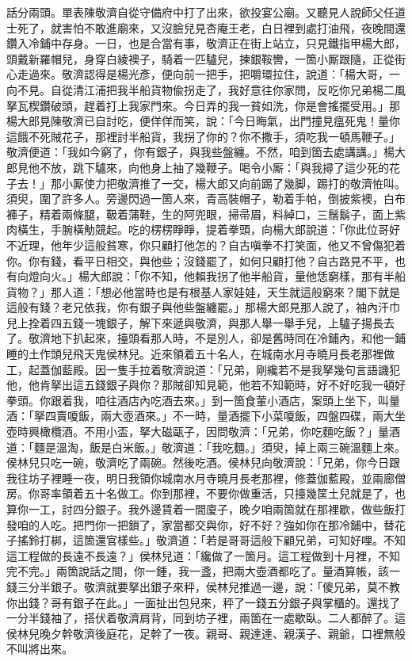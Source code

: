 話分兩頭。單表陳敬濟自從守備府中打了出來，欲投宴公廟。又聽見人說師父任道士死了，就害怕不敢進廟來，又沒臉兒見杏庵王老，白日裡到處打油飛，夜晚間還鑽入冷鋪中存身。一日，也是合當有事，敬濟正在街上站立，只見鐵指甲楊大郎，頭戴新羅帽兒，身穿白綾襖子，騎着一匹驢兒，揀銀鞍轡，一箇小厮跟隨，正從街心走過來。敬濟認得是楊光彥，便向前一把手，把嚼環拉住，說道：「楊大哥，一向不見。自從清江浦把我半船貨物偸拐走了，我好意往你家問，反吃你兄弟楊二風拏瓦楔鑽破頭，趕着打上我家門來。今日弄的我一貧如洗，你是會搖擺受用。」那楊大郎見陳敬濟已自討吃，便佯佯而笑，說：「今日晦氣，出門撞見瘟死鬼！量你這餓不死賊花子，那裡討半船貨，我拐了你的？你不撒手，須吃我一頓馬鞭子。」敬濟便道：「我如今窮了，你有銀子，與我些盤纏。不然，咱到箇去處講講。」楊大郎見他不放，跳下驢來，向他身上抽了幾鞭子。喝令小厮：「與我撏了這少死的花子去！」那小厮使力把敬濟推了一交，楊大郎又向前踢了幾脚，踢打的敬濟恠叫。須臾，圍了許多人。旁邊閃過一箇人來，青高裝帽子，勒着手帕，倒披紫襖，白布褲子，精着兩條腿，靸着蒲鞋，生的阿兜眼，掃帚眉，料綽口，三鬚鬍子，面上紫肉橫生，手腕橫觔競起。吃的楞楞睜睜，提着拳頭，向楊大郎說道：「你此位哥好不近理，他年少這般貧寒，你只顧打他怎的？{}自古嗔拳不打笑面，他又不曾傷犯着你。你有錢，看平日相交，與他些；沒錢罷了，如何只顧打他？自古路見不平，也有向燈向火。」楊大郎說：「你不知，他賴我拐了他半船貨，量他恁窮樣，那有半船貨物？」那人道：「想必他當時也是有根基人家娃娃，天生就這般窮來？閣下就是這般有錢？老兄依我，你有銀子與他些盤纏罷。」那楊大郎見那人說了，袖內汗巾兒上拴着四五錢一塊銀子，解下來遞與敬濟，與那人舉一舉手兒，上驢子揚長去了。敬濟地下扒起來，擡頭看那人時，不是別人，卻是舊時同在冷鋪內，和他一鋪睡的土作頭兒飛天鬼侯林兒。近來領着五十名人，在城南水月寺曉月長老那裡做工，起蓋伽藍殿。因一隻手拉着敬濟說道：「兄弟，剛纔若不是我拏幾句言語譏犯他，他肯拏出這五錢銀子與你？那賊卻知見範，他若不知範時，好不好吃我一頓好拳頭。你跟着我，咱往酒店內吃酒去來。」到一箇食葷小酒店，案頭上坐下，叫量酒：「拏四賣嗄飯，兩大壺酒來。」不一時，量酒擺下小菜嗄飯，四盤四碟，兩大坐壺時興橄欖酒。不用小盃，拏大磁甌子，因問敬濟：「兄弟，你吃麵吃飯？」量酒道：「麵是溫淘，飯是白米飯。」敬濟道：「我吃麵。」須臾，掉上兩三碗溫麵上來。侯林兒只吃一碗，敬濟吃了兩碗。然後吃酒。侯林兒向敬濟說：「兄弟，你今日跟我往坊子裡睡一夜，{}明日我領你城南水月寺曉月長老那裡，修蓋伽藍殿，並兩廊僧房。你哥率領着五十名做工。你到那裡，不要你做重活，只擡幾筐土兒就是了，也算你一工，討四分銀子。我外邊賃着一間廈子，晚夕咱兩箇就在那裡歇，{}做些飯打發咱的人吃。把門你一把鎖了，家當都交與你，{}好不好？強如你在那冷鋪中，替花子搖鈴打梆，這箇還官樣些。」敬濟道：「若是哥哥這般下顧兄弟，可知好哩。不知這工程做的長遠不長遠？」侯林兒道：「纔做了一箇月。這工程做到十月裡，不知完不完。」兩箇說話之間，你一鍾，我一盞，把兩大壺酒都吃了。量酒算帳，該一錢三分半銀子。敬濟就要拏出銀子來秤，侯林兒推過一邊，說：「傻兄弟，莫不教你出錢？哥有銀子在此。」一面扯出包兒來，秤了一錢五分銀子與掌櫃的。還找了一分半錢袖了，搭伏着敬濟肩背，同到坊子裡，兩箇在一處歇臥。二人都醉了。這侯林兒晚夕幹敬濟後庭花，足幹了一夜。親哥、親達達、親漢子、親爺，口裡無般不叫將出來。

